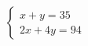 \documentclass[preview]{standalone}
\begin{document}
\begin{align*}
\begin{cases} x + y = 35 \\ 2x + 4y = 94 \end{cases}
\end{align*}
\end{document}
